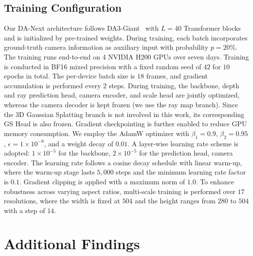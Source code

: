 \documentclass{llmxive}
\providecommand{\ours}{DA-Next\xspace}
\begin{document}
\subsection{Training Configuration}
Our \ours architecture follows DA3-Giant~\citep{lin2025depth} with $L = 40$ Transformer blocks and is initialized by pre-trained weights.
%
During training, each batch incorporates ground-truth camera information as auxiliary input with probability $p=20\%$.
%
The training runs end-to-end on 4 NVIDIA H200 GPUs over seven days.
%
Training is conducted in BF16 mixed precision with a fixed random seed of $42$ for $10$ epochs in total. 
%
The per-device batch size is $18$ frames, and gradient accumulation is performed every $2$ steps.
%
During training, the backbone, depth and ray prediction head, camera encoder, and scale head are jointly optimized, whereas the camera decoder is kept frozen (we use the ray map branch).
%
Since the 3D Gaussian Splatting branch is not involved in this work, its corresponding GS Head is also frozen.
%
Gradient checkpointing is further enabled to reduce GPU memory consumption.
%
We employ the AdamW optimizer with $\beta_1 = 0.9$, $\beta_2 = 0.95$, $\epsilon = 1 \times 10^{-8}$, and a weight decay of $0.01$. A layer-wise learning rate scheme is adopted: $1 \times 10^{-5}$ for the backbone, $2 \times 10^{-5}$ for the prediction head, camera encoder. 
%
The learning rate follows a cosine decay schedule with linear warm-up, where the warm-up stage lasts $5{,}000$ steps and the minimum learning rate factor is $0.1$. Gradient clipping is applied with a maximum norm of $1.0$.
%
To enhance robustness across varying aspect ratios, multi-scale training is performed
over $17$ resolutions, where the width is fixed at $504$ and the height ranges
from $280$ to $504$ with a step of $14$.


\section{Additional Findings}
\label{appendix:other_findings}
\end{document}
